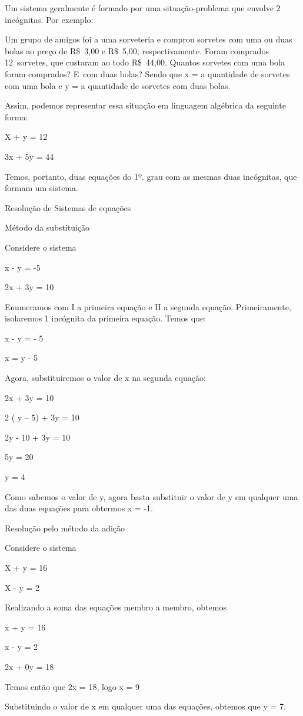 Um sistema geralmente é formado por uma situação-problema que envolve 2
incógnitas. Por exemplo:

Um grupo de amigos foi a uma sorveteria e comprou sorvetes com uma ou
duas bolas ao preço de R\$~3,00 e R\$~5,00, respectivamente. Foram
comprados 12~sorvetes, que custaram ao todo R\$~44,00. Quantos sorvetes
com uma bola foram comprados? E~com duas bolas? Sendo que x = a
quantidade de sorvetes com uma bola e y = a quantidade de sorvetes com
duas bolas.

Assim, podemos representar essa situação em linguagem algébrica da
seguinte forma:

X + y = 12

3x + 5y = 44

Temos, portanto, duas equações do 1º. grau com as mesmas duas
incógnitas, que formam um sistema.

Resolução de Sistemas de equações

Método da substituição

Considere o sistema

x - y = -5

2x + 3y = 10

Enumeramos com I a primeira equação e II a segunda equação.
Primeiramente, isolaremos 1 incógnita da primeira equação. Temos que:

x - y = - 5

x = y - 5

Agora, substituiremos o valor de x na segunda equação:

2x + 3y = 10

2 ( y -- 5) + 3y = 10

2y - 10 + 3y = 10

5y = 20

y = 4

Como sabemos o valor de y, agora basta substituir o valor de y em
qualquer uma das duas equações para obtermos x = -1.

Resolução pelo método da adição

Considere o sistema

X + y = 16

X - y = 2

Realizando a soma das equações membro a membro, obtemos

x + y = 16

x - y = 2

2x + 0y = 18

Temos então que 2x = 18, logo x = 9

Substituindo o valor de x em qualquer uma das equações, obtemos que y =
7.

